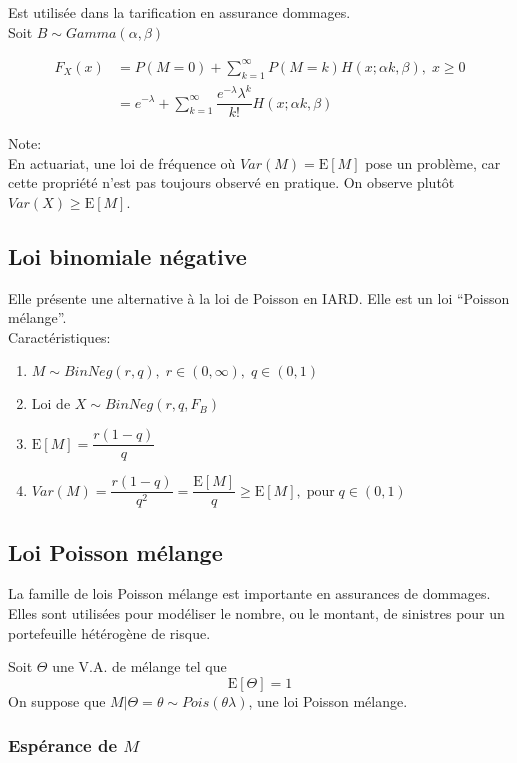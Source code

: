 \documentclass[]{book}
\theoremstyle{definition}
\theoremstyle{definition}
\theoremstyle{definition}
\theoremstyle{remark}
\begin{document}
Est utilisée dans la tarification en assurance dommages.\\
Soit \(B \sim Gamma(\alpha,\beta)\)

\begin{align*}
F_X(x)& = P(M=0)+\sum^\infty_{k=1} P(M=k) H(x;\alpha k,\beta),\;x \geq 0\\
& = e^{-\lambda} +\sum^\infty_{k=1} \dfrac{e^{-\lambda}\lambda^k}{k!}H(x;\alpha k,\beta) 
\end{align*}

Note:\\
En actuariat, une loi de fréquence où \(Var(M)=\text{E}[M]\) pose un
problème, car cette propriété n'est pas toujours observé en pratique. On
observe plutôt \(Var(X) \geq \text{E}[M]\).

\subsection{Loi binomiale négative}\label{loi-binomiale-negative}

Elle présente une alternative à la loi de Poisson en IARD. Elle est un
loi ``Poisson mélange''.\\
Caractéristiques:

\begin{enumerate}
\item $M \sim BinNeg(r,q),\;r \in (0,\infty),\; q\in (0,1)$
\item Loi de $X \sim BinNeg(r,q,F_B)$
\item $\text{E}[M]=\dfrac{r(1-q)}{q}$
\item $Var(M)=\dfrac{r(1-q)}{q^2}=\dfrac{\text{E}[M]}{q} \geq \text{E}[M],\; \text{pour}\; q\in(0,1)$
\end{enumerate}

\subsection{Loi Poisson mélange}\label{loi-poisson-melange}

La famille de lois Poisson mélange est importante en assurances de
dommages. Elles sont utilisées pour modéliser le nombre, ou le montant,
de sinistres pour un portefeuille hétérogène de risque.

Soit \(\Theta\) une V.A. de mélange tel que\\
\[\text{E}[\Theta]=1\] On suppose que
\(M|\Theta=\theta \sim Pois(\theta \lambda)\), une loi Poisson mélange.

\subsubsection{\texorpdfstring{Espérance de
\(M\)}{Espérance de M}}\label{esperance-de-m}
\end{document}
